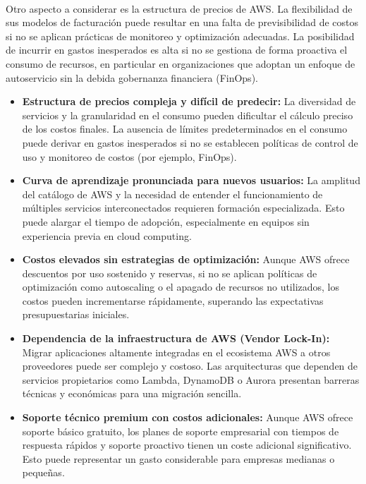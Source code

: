 {                \paragraph{}Otro aspecto a considerar es la estructura de precios de AWS. La flexibilidad de sus modelos de facturación puede resultar en una falta de previsibilidad de costos si no se aplican prácticas de monitoreo y optimización adecuadas. La posibilidad de incurrir en gastos inesperados es alta si no se gestiona de forma proactiva el consumo de recursos, en particular en organizaciones que adoptan un enfoque de autoservicio sin la debida gobernanza financiera (FinOps).

                \begin{itemize}
                    \item \textbf{Estructura de precios compleja y difícil de predecir:} La diversidad de servicios y la granularidad en el consumo pueden dificultar el cálculo preciso de los costos finales. La ausencia de límites predeterminados en el consumo puede derivar en gastos inesperados si no se establecen políticas de control de uso y monitoreo de costos (por ejemplo, FinOps).
                    \item \textbf{Curva de aprendizaje pronunciada para nuevos usuarios:} La amplitud del catálogo de AWS y la necesidad de entender el funcionamiento de múltiples servicios interconectados requieren formación especializada. Esto puede alargar el tiempo de adopción, especialmente en equipos sin experiencia previa en cloud computing.
                    \item \textbf{Costos elevados sin estrategias de optimización:} Aunque AWS ofrece descuentos por uso sostenido y reservas, si no se aplican políticas de optimización como autoscaling o el apagado de recursos no utilizados, los costos pueden incrementarse rápidamente, superando las expectativas presupuestarias iniciales.
                    \item \textbf{Dependencia de la infraestructura de AWS (Vendor Lock-In):} Migrar aplicaciones altamente integradas en el ecosistema AWS a otros proveedores puede ser complejo y costoso. Las arquitecturas que dependen de servicios propietarios como Lambda, DynamoDB o Aurora presentan barreras técnicas y económicas para una migración sencilla.
                    \item \textbf{Soporte técnico premium con costos adicionales:} Aunque AWS ofrece soporte básico gratuito, los planes de soporte empresarial con tiempos de respuesta rápidos y soporte proactivo tienen un coste adicional significativo. Esto puede representar un gasto considerable para empresas medianas o pequeñas.

\end{itemize}}
